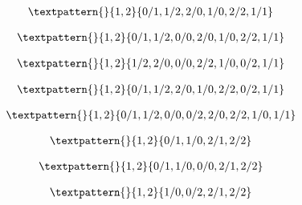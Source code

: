 \begin{equation}
	\begin{gathered}
		\textpattern{}{1,2}{0/1,1/2,2/0,1/0,2/2,1/1}
	\end{gathered}
	\label{cls:142}
\end{equation}

\begin{equation}
	\begin{gathered}
		\textpattern{}{1,2}{0/1,1/2,0/0,2/0,1/0,2/2,1/1}
	\end{gathered}
	\label{cls:143}
\end{equation}

\begin{equation}
	\begin{gathered}
		\textpattern{}{1,2}{1/2,2/0,0/0,2/2,1/0,0/2,1/1}
	\end{gathered}
	\label{cls:144}
\end{equation}

\begin{equation}
	\begin{gathered}
		\textpattern{}{1,2}{0/1,1/2,2/0,1/0,2/2,0/2,1/1}
	\end{gathered}
	\label{cls:145}
\end{equation}

\begin{equation}
	\begin{gathered}
		\textpattern{}{1,2}{0/1,1/2,0/0,0/2,2/0,2/2,1/0,1/1}
	\end{gathered}
	\label{cls:146}
\end{equation}

\begin{equation}
	\begin{gathered}
		\textpattern{}{1,2}{0/1,1/0,2/1,2/2}
	\end{gathered}
	\label{cls:147}
\end{equation}

\begin{equation}
	\begin{gathered}
		\textpattern{}{1,2}{0/1,1/0,0/0,2/1,2/2}
	\end{gathered}
	\label{cls:148}
\end{equation}

\begin{equation}
	\begin{gathered}
		\textpattern{}{1,2}{1/0,0/2,2/1,2/2}
	\end{gathered}
	\label{cls:149}
\end{equation}

